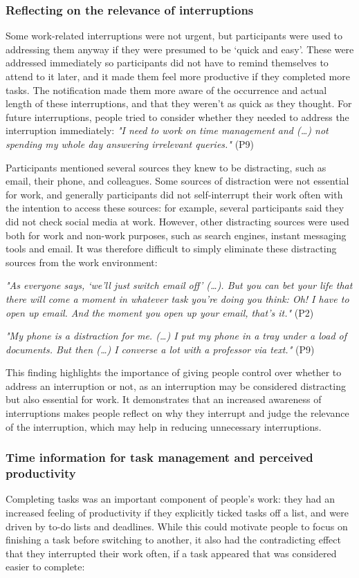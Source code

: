 \subsubsection{Reflecting on the relevance of interruptions}
Some work-related interruptions were not urgent, but participants were used to addressing them anyway if they were presumed to be ‘quick and easy’. These were addressed immediately so participants did not have to remind themselves to attend to it later, and it made them feel more productive if they completed more tasks. The notification made them more aware of the occurrence and actual length of these interruptions, and that they weren’t as quick as they thought. For future interruptions, people tried to consider whether they needed to address the interruption immediately:  \textit{"I need to work on time management and (…) not spending my whole day answering irrelevant queries."} (P9)

Participants mentioned several sources they knew to be distracting, such as email, their phone, and colleagues. Some sources of distraction were not essential for work, and generally participants did not self-interrupt their work often with the intention to access these sources: for example, several participants said they did not check social media at work. However, other distracting sources were used both for work and non-work purposes, such as search engines, instant messaging tools and email. It was therefore difficult to simply eliminate these distracting sources from the work environment:

\textit{"As everyone says, ‘we’ll just switch email off’ (…). But you can bet your life that there will come a moment in whatever task you’re doing you think: Oh! I have to open up email. And the moment you open up your email, that’s it."} (P2)

\textit{"My phone is a distraction for me. (…) I put my phone in a tray under a load of documents. But then (…) I converse a lot with a professor via text."} (P9)

This finding highlights the importance of giving people control over whether to address an interruption or not, as an interruption may be considered distracting but also essential for work. It demonstrates that an increased awareness of interruptions makes people reflect on why they interrupt and judge the relevance of the interruption, which may help in reducing unnecessary interruptions.

\subsubsection{Time information for task management and perceived productivity}
Completing tasks was an important component of people's work: they had an increased feeling of productivity if they explicitly ticked tasks off a list, and were driven by to-do lists and deadlines. While this could motivate people to focus on finishing a task before switching to another, it also had the contradicting effect that they interrupted their work often, if a task appeared that was considered easier to complete: 

